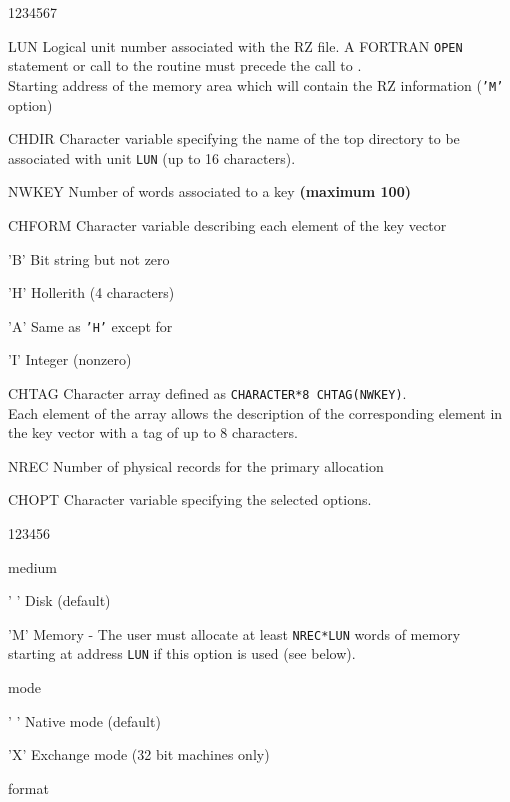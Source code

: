 \begin{DLtt}{1234567}
\item[LUN]Logical unit number associated with the RZ file.
A FORTRAN {\tt OPEN} statement or call to the
routine  must precede the call to .\\
Starting address of the memory area which will contain the
RZ information ({\tt'M'} option)
\item[CHDIR]Character variable specifying the name of the top directory to be
associated with unit {\tt LUN} (up to 16 characters).
\item[NWKEY] Number of words associated to a key {\bf (maximum 100)}
\item[CHFORM] Character variable describing each element of the key vector
\begin{DLtt}{12}
\item['B']Bit string but not zero
\item['H']Hollerith (4 characters)
\item['A']Same as {\tt'H'} except for 
\item['I']Integer (nonzero)
\end{DLtt}
\item[CHTAG]Character array defined as {\tt CHARACTER*8 CHTAG(NWKEY)}.\\
Each element of the array allows the description of the corresponding
element in the key vector with a tag of up to 8 characters.
\item[NREC]Number of physical records for the primary allocation
\item[CHOPT]Character variable specifying the selected options.
\begin{DLtt}{123456}
\item[{\rm medium}]
\begin{DLtt}{12}
\item[' ']Disk (default)
\item['M']Memory - The user must allocate at least {\tt NREC*LUN} words
of memory starting at address {\tt LUN} if this option is used
(see below).
\end{DLtt}
\item[{\rm mode}]
\begin{DLtt}{12}
\item[' ']Native mode (default)
\item['X']Exchange mode (32 bit machines only)
\end{DLtt}
\item[{\rm format}]
\begin{DLtt}{12}

\end{DLtt}
\end{DLtt}
\end{DLtt}

